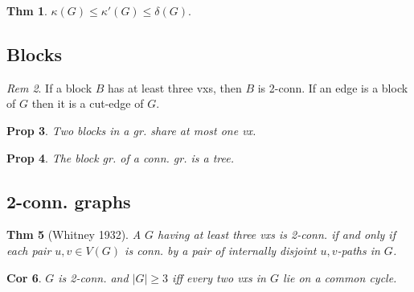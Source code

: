 \documentclass[11pt, fleqn, a4paper, landscape]{article}
\theoremstyle{plain} %
\newtheorem{thm}{Thm}
\newtheorem{pro}[thm]{Prop}
\newtheorem{cor}[thm]{Cor}
\theoremstyle{remark} %
\newtheorem{rem}[thm]{Rem}
\theoremstyle{definition} %
\newtheorem{defi}[thm]{Def}
\begin{document}
\begin{multicols}{5}
\begin{thm}
$\kappa (G) \le \kappa'(G) \le \delta(G).$
\end{thm}

\subsection{Blocks}
\addtocounter{thm}{2}
\begin{rem}
If a block $B$ has at least three vxs, then $B$ is 2-conn. If an edge is a block of $G$ then it is a cut-edge of $G$.
\end{rem}

\begin{pro}
Two blocks in a gr. share at most one vx.
\end{pro}

\addtocounter{thm}{2}
\begin{pro}
The block gr. of a conn. gr. is a tree.
\end{pro}

\subsection{2-conn. graphs}

\addtocounter{thm}{1}
\begin{thm}[Whitney 1932]
A $G$ having at least three vxs is 2-conn. if and only
if each pair $u, v \in V (G)$ is conn. by a pair of internally disjoint $u, v$-paths in $G$.
\end{thm}

\begin{cor}
$G$ is 2-conn. and $|G|\ge 3$ iff every two vxs in $G$ lie on a common cycle.
\end{cor}

\end{multicols}
\end{document}
